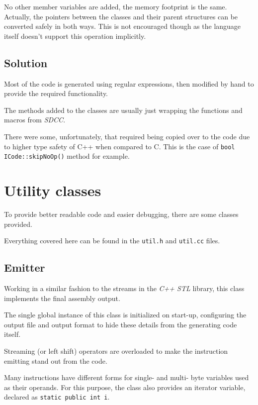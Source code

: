     No other member variables are added, the memory footprint is the same. Actually, the pointers between the classes and their parent structures can be converted safely in both ways. This is not encouraged though as the language itself doesn't support this operation implicitly.

    \subsection{Solution}

    Most of the code is generated using regular expressions, then modified by hand to provide the required functionality.

    The methods added to the classes are usually just wrapping the functions and macros from \emph{SDCC}.

    There were some, unfortunately, that required being copied over to the code due to higher type safety of C++ when compared to C. This is the case of \texttt{bool ICode::skipNoOp()} method for example.

\section{Utility classes}

To provide better readable code and easier debugging, there are some classes provided.

Everything covered here can be found in the \texttt{util.h} and \texttt{util.cc} files.

    \subsection{Emitter}\label{emitter}

    Working in a similar fashion to the streams in the \emph{C++ STL} library, this class implements the final assembly output.

    The single global instance of this class is initialized on start-up, configuring the output file and output format to hide these details from the generating code itself.

    Streaming (or left shift) operators are overloaded to make the instruction emitting stand out from the code.

    Many instructions have different forms for single- and multi- byte variables used as their operands. For this purpose, the class also provides an iterator variable, declared as \texttt{static public int i}.

